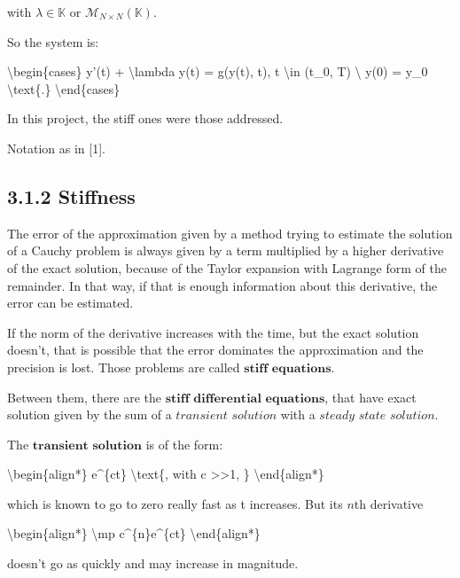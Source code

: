 \documentclass[letterpaper,10pt,english]{jupyterBook}
\begin{document}
\sphinxAtStartPar
with \(\lambda \in \mathbb{K}\) or \(\mathscr{M}_{N \times N}(\mathbb{K})\).

\sphinxAtStartPar
So the system is:

\sphinxAtStartPar
\textbackslash{}begin\{cases\}
y’(t) + \textbackslash{}lambda y(t) = g(y(t), t), t \textbackslash{}in (t\_0, T) \textbackslash{}
y(0) = y\_0
\textbackslash{}text\{.\}
\textbackslash{}end\{cases\}

\sphinxAtStartPar
In this project, the stiff ones were those addressed.

\sphinxAtStartPar
Notation as in {[}1{]}.


\subsection{3.1.2 Stiffness}
\label{\detokenize{cap1:stiffness}}
\sphinxAtStartPar
The error of the approximation given by a method trying to estimate the solution of a Cauchy problem is always given by a term multiplied by a higher derivative of the exact solution, because of the Taylor expansion with Lagrange form of the remainder. In that way, if that is enough information about this derivative, the error can be estimated.

\sphinxAtStartPar
If the norm of the derivative increases with the time, but the exact solution doesn’t, that is possible that the error dominates the approximation and the precision is lost. Those problems are called \(\textbf{stiff equations}\).

\sphinxAtStartPar
Between them, there are the \(\textbf{stiff differential equations}\), that have exact solution given by the sum of a \(\textit{transient solution}\) with a \(\textit{steady state solution}\).

\sphinxAtStartPar
The \(\textbf{transient solution}\) is of the form:

\sphinxAtStartPar
\textbackslash{}begin\{align*\}
e\textasciicircum{}\{\sphinxhyphen{}ct\} \textbackslash{}text\{, with c >>1, \}
\textbackslash{}end\{align*\}

\sphinxAtStartPar
which is known to go to zero really fast as t increases. But its \(n\)th derivative

\sphinxAtStartPar
\textbackslash{}begin\{align*\}
\textbackslash{}mp c\textasciicircum{}\{n\}e\textasciicircum{}\{\sphinxhyphen{}ct\}
\textbackslash{}end\{align*\}

\sphinxAtStartPar
doesn’t go as quickly and may increase in magnitude.
\end{document}

